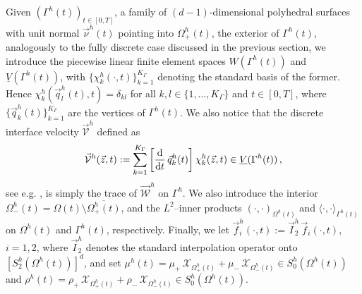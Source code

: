 \documentclass[a4paper,12pt,onecolumn]{article}
\newcommand{\W}{\vec{\mathcal W}}
\newcommand{\bigchi}{\ensuremath{\mathrm{\mathcal{X}}}}
\newcommand{\charfcn}[1]{\bigchi_{#1}} %
\newcommand{\Vht}{\underline{V}(\Gamma^h(t))}
\newcommand{\Wht}{W(\Gamma^h(t))}
\newcommand{\ddt}{\frac{\rm d}{{\rm d}t}}
\newcommand{\V}{\vec{\mathcal{V}}} %
\begin{document}
Given $(\Gamma^h(t))_{t\in[0,T]}$, a family of
$(d-1)$-dimensional polyhedral surfaces with unit normal $\vec\nu^h(t)$
pointing into $\Omega^h_+(t)$, the exterior of $\Gamma^h(t)$,
analogously to the fully discrete case discussed in the previous section, we
introduce the
piecewise linear finite element spaces $\Wht$ and $\Vht$, with
$\{\chi^h_k(\cdot,t)\}_{k=1}^{K_\Gamma}$ denoting the standard basis of the
former. Hence $\chi^h_k(\vec q^h_l(t),t) = \delta_{kl}$ for all
$k,l \in \{1,\ldots,K_\Gamma\}$ and $t \in [0,T]$, where
$\{\vec q^h_k(t)\}_{k=1}^{K_\Gamma}$ are the vertices of $\Gamma^h(t)$. We also
notice that the discrete interface velocity $\V^h$ defined as
\begin{equation}\label{eq:Vsemidisc}
\V^h(\vec z, t):=
\sum_{k=1}^{K_\Gamma}\left[\ddt\,\vec q^h_k(t)\right] \chi^h_k(\vec z, t)
\in \Vht\,,
\end{equation}
see e.g. \cite[(3.3)]{tpfs}, is simply the trace of $\W^h$ on $\Gamma^h$.
We also introduce the interior $\Omega^h_-(t) = \Omega(t) \setminus
\overline{\Omega^h_+(t)}$, and the $L^2$--inner products
$(\cdot,\cdot)_{\Omega^h(t)}$ and $\langle\cdot,\cdot\rangle_{\Gamma^h(t)}$
on $\Omega^h(t)$ and $\Gamma^h(t)$, respectively.
Finally, we let $\vec f_i^h(\cdot,t) := \vec I^h_2\,\vec f_i(\cdot,t)$,
$i=1,2$, where $\vec I^h_2$ denotes the standard interpolation operator onto
$[S^h_2(\Omega^h(t))]^d$, and set
$\mu^h(t) = \mu_+\,\charfcn{\Omega^h_+(t)} + \mu_-\,\charfcn{\Omega^h_-(t)}\in
S^h_0(\Omega^h(t))$
and
$\rho^h(t)
= \rho_+\,\charfcn{\Omega^h_+(t)} + \rho_-\,\charfcn{\Omega^h_-(t)}\in
S^h_0(\Omega^h(t))$.
\end{document}
